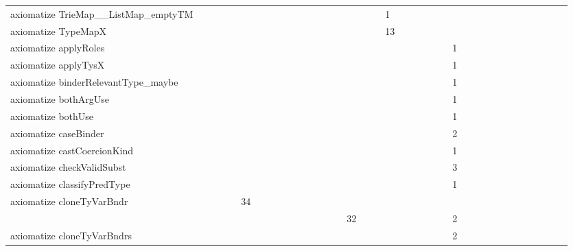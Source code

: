 {\begin{tabular}{l|rrr|rrr|rrr}
axiomatize TrieMap__ListMap_emptyTM &  &  &  &  &  &  &  &  &  &  &  &  &  &  &  &  &  & 1 &  &  &  &  &  &  &  &  &  &  &  &  &  &  &  &  &  & \\
axiomatize TypeMapX &  &  &  &  &  &  &  &  &  &  &  &  &  &  &  &  &  & 13 &  &  &  &  &  &  &  &  &  &  &  &  &  &  &  &  &  & \\
axiomatize applyRoles &  &  &  &  &  &  &  &  &  &  &  &  &  &  &  &  &  &  &  &  &  &  &  & 1 &  &  &  &  &  &  &  &  &  &  &  & \\
axiomatize applyTysX &  &  &  &  &  &  &  &  &  &  &  &  &  &  &  &  &  &  &  &  &  &  &  & 1 &  &  &  &  &  &  &  &  &  &  &  & \\
axiomatize binderRelevantType_maybe &  &  &  &  &  &  &  &  &  &  &  &  &  &  &  &  &  &  &  &  &  &  &  & 1 &  &  &  &  &  &  &  &  &  &  &  & \\
axiomatize bothArgUse &  &  &  &  &  &  &  &  &  &  &  &  &  &  &  &  &  &  &  &  &  &  &  & 1 &  &  &  &  &  &  &  &  &  &  &  & \\
axiomatize bothUse &  &  &  &  &  &  &  &  &  &  &  &  &  &  &  &  &  &  &  &  &  &  &  & 1 &  &  &  &  &  &  &  &  &  &  &  & \\
axiomatize caseBinder &  &  &  &  &  &  &  &  &  &  &  &  &  &  &  &  &  &  &  &  &  &  &  & 2 &  &  &  &  &  &  &  &  &  &  &  & \\
axiomatize castCoercionKind &  &  &  &  &  &  &  &  &  &  &  &  &  &  &  &  &  &  &  &  &  &  &  & 1 &  &  &  &  &  &  &  &  &  &  &  & \\
axiomatize checkValidSubst &  &  &  &  &  &  &  &  &  &  &  &  &  &  &  &  &  &  &  &  &  &  &  & 3 &  &  &  &  &  &  &  &  &  &  &  & \\
axiomatize classifyPredType &  &  &  &  &  &  &  &  &  &  &  &  &  &  &  &  &  &  &  &  &  &  &  & 1 &  &  &  &  &  &  &  &  &  &  &  & \\
axiomatize cloneTyVarBndr &  &  &  &  & 34 &  &  &  & \\
\quad  &  &  &  &  &  &  &  &  &  &  &  &  &  &  & 32 &  &  &  &  &  &  &  &  & 2 &  &  &  &  &  &  &  &  &  &  &  & \\
axiomatize cloneTyVarBndrs &  &  &  &  &  &  &  &  &  &  &  &  &  &  &  &  &  &  &  &  &  &  &  & 2 &  &  &  &  &  &  &  &  &  &  &  & \\

\end{tabular}}
